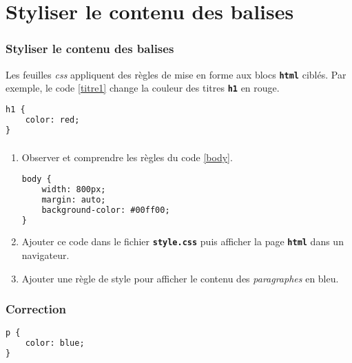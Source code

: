 \documentclass[svgnames,11pt]{beamer}
\begin{document}
\section{Styliser le contenu des balises}
\begin{frame}[fragile]
    \frametitle{Styliser le contenu des balises}

    Les feuilles \emph{css} appliquent des règles de mise en forme aux blocs \textbf{\texttt{html}} ciblés. Par exemple, le code \ref{titre1} change la couleur des titres \textbf{\texttt{h1}} en rouge.

\begin{center}
\begin{lstlisting}[language=HTML , basicstyle=\ttfamily\small, xleftmargin=2em, xrightmargin=2em]
h1 {
    color: red;
}
\end{lstlisting}
\label{titre1}
\end{center}

\end{frame}
\begin{frame}[fragile]
    \frametitle{}

    \begin{activite}
    \begin{enumerate}
        \item Observer et comprendre les règles du code \ref{body}.
        \begin{center}
            \begin{lstlisting}[language=HTML , basicstyle=\ttfamily\small, xleftmargin=2em, xrightmargin=2em]
body {
    width: 800px;
    margin: auto;
    background-color: #00ff00;
}
\end{lstlisting}
\label{body}
    \end{center}
\item Ajouter ce code dans le fichier \textbf{\texttt{style.css}} puis afficher la page \textbf{\texttt{html}} dans un navigateur.
\item Ajouter une règle de style pour afficher le contenu des \emph{paragraphes} en bleu.
    \end{enumerate}
    \end{activite}

\end{frame}
\begin{frame}[fragile]
    \frametitle{Correction}

    \begin{center}
\begin{lstlisting}[language=HTML , basicstyle=\ttfamily\small, xleftmargin=2em, xrightmargin=2em]
p {
    color: blue;
}
\end{lstlisting}
\end{center}  

\end{frame}
\end{document}
